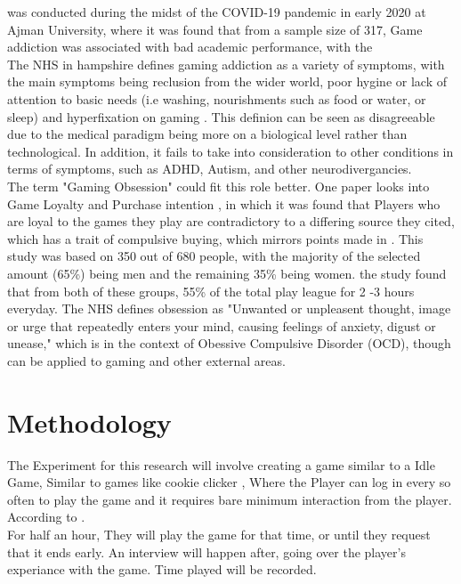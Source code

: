 \documentclass[conference]{IEEEtran}
\begin{document}
\cite{Naaj2021} was conducted during the midst of the COVID-19 pandemic in early 2020 at Ajman University, where it was found that from a sample size of 317, Game addiction was associated with bad academic performance, with the \\

The NHS in hampshire defines gaming addiction as a variety of symptoms, with the main symptoms being reclusion from the wider world, poor hygine or lack of attention to basic needs (i.e washing, nourishments such as food or water, or sleep) and hyperfixation on gaming \cite{NHSHamp24}. This definion can be seen as disagreeable due to the medical paradigm being more on a biological level rather than technological. In addition, it fails to take into consideration to other conditions in terms of symptoms, such as ADHD, Autism, and other neurodivergancies.\\

The term "Gaming Obsession" could fit this role better. One paper looks into Game Loyalty and Purchase intention \cite{Ramli2022}, in which it was found that Players who are loyal to the games they play are contradictory to a differing source they cited\cite{Widodo2020}, which has a trait of compulsive buying, which mirrors points made in \cite {yasir2021}.  This study was based on 350 out of 680 people, with the majority of the selected amount (65\%) being men and the remaining 35\% being women. the study found that from both of these groups, 55\% of the total play league for 2 -3 hours everyday. The NHS  \cite{NHS2021} defines obsession as "Unwanted or unpleasent thought, image or urge that repeatedly enters your mind, causing feelings of anxiety, digust or unease," which is in the context of Obessive Compulsive Disorder (OCD), though can be applied to gaming and other external areas.\\

\section{Methodology}
The Experiment for this research will involve creating a game similar to a Idle Game, Similar to games like cookie clicker \cite{CookieSteam21}, Where the Player can log in every so often to play the game and it requires bare minimum interaction from the player. According to \cite{Hwang2024}.\\
\newline
For half an hour, They will play the game for that time, or until they request that it ends early. An interview will happen after, going over the player's experiance with the game. Time played will be recorded.\\
\end{document}
